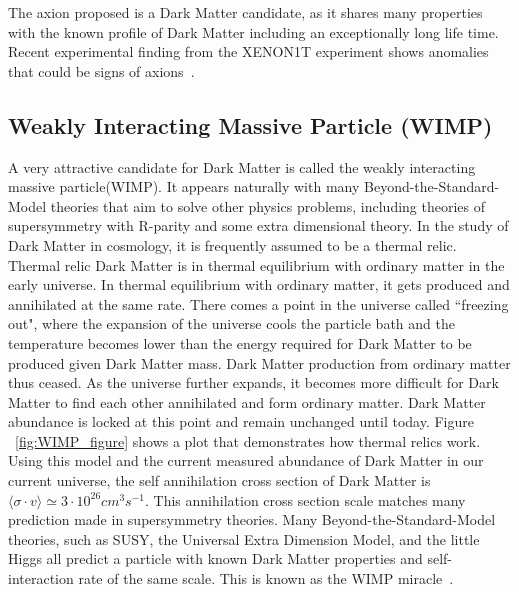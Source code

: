 The axion proposed is a Dark Matter candidate, as it shares many properties with the known profile of Dark Matter including an exceptionally long life time. Recent experimental finding from the XENON1T experiment shows anomalies that could be signs of axions~\cite{aprile2020excess}.



\subsection{Weakly Interacting Massive Particle (WIMP)}
A very attractive candidate for Dark Matter is called the weakly interacting massive particle(WIMP). It appears naturally with many Beyond-the-Standard-Model theories that aim to solve other physics problems, including theories of supersymmetry with R-parity and some extra dimensional theory. 
In the study of Dark Matter in cosmology, it is frequently assumed to be a thermal relic. Thermal relic Dark Matter is in thermal equilibrium with ordinary matter in the early universe. In thermal equilibrium with ordinary matter, it gets produced and annihilated at the same rate. There comes a point in the universe called ``freezing out", where the expansion of the universe cools the particle bath and the temperature becomes lower than the energy required for Dark Matter to be produced given
Dark Matter mass. Dark Matter production from ordinary matter thus ceased. As the universe further expands, it becomes more difficult for Dark Matter to find each other annihilated and form ordinary matter. Dark Matter abundance is locked at this point and remain unchanged until today. Figure ~\ref{fig:WIMP_figure} shows a plot that demonstrates how thermal relics work. Using this model and the current measured abundance of Dark Matter in our current universe, the self annihilation cross section of Dark Matter is $ \langle \sigma \cdot v \rangle \simeq 3 \cdot 10^{26}cm^{3} s^{-1}$. This annihilation cross section scale matches many prediction made in supersymmetry theories. Many Beyond-the-Standard-Model theories, such as SUSY, the Universal Extra Dimension Model, and the little Higgs all predict a particle with known Dark Matter properties and self-interaction rate of the same scale. This is known as the WIMP miracle~\cite{Dev_2014}.

